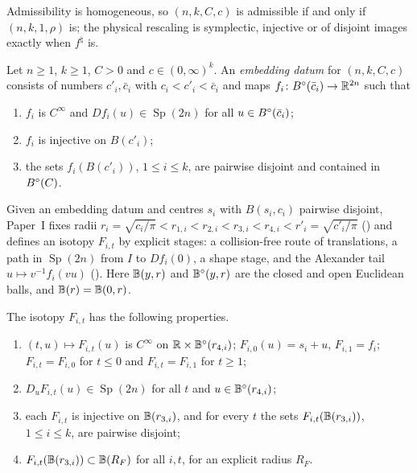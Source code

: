Admissibility is homogeneous, so $(n,k,C,c)$ is admissible if and only if $(n,k,1,\rho)$ is; the physical rescaling
is symplectic, injective or of disjoint images exactly when $f^\natural$ is.

\begin{definition}\label{I:def:ham-datum}
Let $n\ge1$, $k\ge1$, $C>0$ and $c\in(0,\infty)^k$. An \emph{embedding datum} for $(n,k,C,c)$ consists of numbers
$c'_i,\bar c_i$ with $c_i<c'_i<\bar c_i$ and maps $f_i\colon B^{\circ}(\bar c_i)\to\mathbb{R}^{2n}$ such that
\begin{enumerate}[label=(\roman*)]
\item $f_i$ is $C^\infty$ and $Df_i(u)\in\operatorname{Sp}(2n)$ for all $u\in B^{\circ}(\bar c_i)$;
\item $f_i$ is injective on $B(c'_i)$;
\item the sets $f_i(B(c'_i))$, $1\le i\le k$, are pairwise disjoint and contained in $B^{\circ}(C)$.
\end{enumerate}
\end{definition}

Given an embedding datum and centres $s_i$ with $B(s_i,c_i)$ pairwise disjoint, Paper~I fixes radii
$r_i=\sqrt{c_i/\pi}<r_{1,i}<r_{2,i}<r_{3,i}<r_{4,i}<r'_i=\sqrt{c'_i/\pi}$ () and defines an
isotopy $F_{i,t}$ by explicit stages: a collision-free route of translations, a path in $\operatorname{Sp}(2n)$ from $I$ to
$Df_i(0)$, a shape stage, and the Alexander tail $u\mapsto v^{-1}f_i(vu)$ (). Here
$\mathbb{B}(y,r)$ and $\mathbb{B}^\circ(y,r)$ are the closed and open Euclidean balls, and $\mathbb{B}(r)=\mathbb{B}(0,r)$.

\begin{proposition}\label{I:prop:ham-isotopy}
The isotopy $F_{i,t}$ has the following properties.
\begin{enumerate}[label=(\alph*)]
\item $(t,u)\mapsto F_{i,t}(u)$ is $C^\infty$ on $\mathbb{R}\times\mathbb{B}^\circ(r_{4,i})$; $F_{i,0}(u)=s_i+u$, $F_{i,1}=f_i$;
 $F_{i,t}=F_{i,0}$ for $t\le0$ and $F_{i,t}=F_{i,1}$ for $t\ge1$;
\item $D_uF_{i,t}(u)\in\operatorname{Sp}(2n)$ for all $t$ and $u\in\mathbb{B}^\circ(r_{4,i})$;
\item each $F_{i,t}$ is injective on $\mathbb{B}(r_{3,i})$, and for every $t$ the sets $F_{i,t}(\mathbb{B}(r_{3,i}))$, $1\le i\le k$, are
 pairwise disjoint;
\item $F_{i,t}(\mathbb{B}(r_{3,i}))\subset\mathbb{B}(R_F)$ for all $i,t$, for an explicit radius $R_F$.
\end{enumerate}
\end{proposition}


